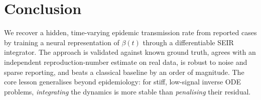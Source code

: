 \documentclass[10pt,twocolumn]{article}
\begin{document}
\section{Conclusion}
We recover a hidden, time-varying epidemic transmission rate from reported cases
by training a neural representation of $\beta(t)$ through a differentiable SEIR
integrator. The approach is validated against known ground truth, agrees with an
independent reproduction-number estimate on real data, is robust to noise and
sparse reporting, and beats a classical baseline by an order of magnitude. The
core lesson generalises beyond epidemiology: for stiff, low-signal inverse ODE
problems, \emph{integrating} the dynamics is more stable than \emph{penalising}
their residual.
\end{document}
